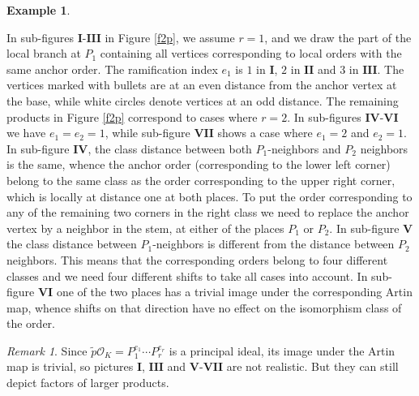 \documentclass{article}
\theoremstyle{definition}
\newtheorem{ex}[Prop]{Example}
\theoremstyle{remark}
\newtheorem{rem}[Prop]{Remark}
\begin{document}
\begin{ex}
\begin{figure}
\end{figure}
In sub-figures
$\mathbf{I}$-$\mathbf{III}$ in Figure
\ref{f2p}, we assume $r=1$, and we draw the part of the local 
branch at $P_1$ containing all vertices corresponding to local 
orders with the same anchor order. The ramification index
$e_1$ is $1$ in $\mathbf{I}$,
$2$ in $\mathbf{II}$ and $3$ in $\mathbf{III}$. 
The vertices marked with
bullets are at an even distance from the anchor vertex
at the base, while white circles denote vertices at an odd
distance.
The remaining products in Figure \ref{f2p} correspond to cases 
where $r=2$. In sub-figures $\mathbf{IV}$-$\mathbf{VI}$
we have $e_1=e_2=1$,
while sub-figure $\mathbf{VII}$ shows a case where 
$e_1=2$ and $e_2=1$.
In sub-figure $\mathbf{IV}$, the class distance between both 
$P_1$-neighbors and
$P_2$ neighbors is the same, whence the anchor order 
(corresponding to the lower left corner) 
belong to the same class
as the order corresponding to the upper right corner, which is 
locally at distance one at both places. To put the order 
corresponding to any of the remaining two corners in the right
class we need to replace the anchor vertex by a neighbor in the
stem, at either of the places $P_1$ or $P_2$.
In sub-figure $\mathbf{V}$ the class distance 
between $P_1$-neighbors is different from the distance between
$P_2$ neighbors. This means that the corresponding 
orders belong 
to four different classes and we need four different shifts to
take all cases into account. In sub-figure $\mathbf{VI}$ 
one of the two places has a
trivial image under the corresponding Artin map, whence shifts
on that direction have no effect on the isomorphism 
class of the order.
\end{ex}

\begin{rem}
    Since $\tilde{p}\mathcal{O}_K=P_1^{e_1}\cdots P_r^{e_r}$ is
    a principal ideal, its image under the 
    Artin map is trivial,
    so pictures $\mathbf{I}$, $\mathbf{III}$ and 
    $\mathbf{V}$-$\mathbf{VII}$ are not realistic. 
    But they can 
    still depict factors of larger products. 
\end{rem}
\end{document}
